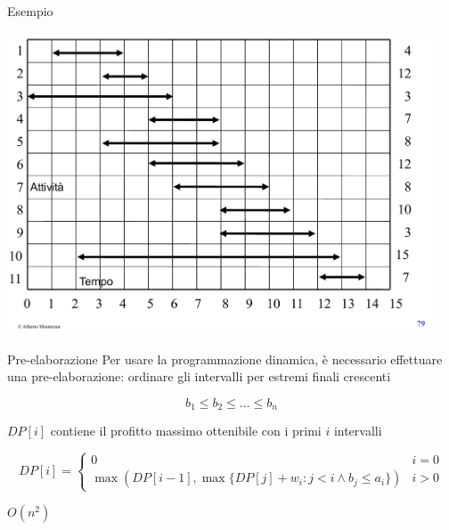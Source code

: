 \begin{frame}{Esempio}

\vspace{-12pt}
\begin{center}
\includegraphics[width=0.95\textwidth,page=2]{intervalli-esempio.pdf}
\end{center}

\end{frame}

\begin{frame}{Pre-elaborazione}
Per usare la programmazione dinamica, è necessario effettuare una pre-elaborazione: ordinare gli intervalli per estremi finali crescenti

  \[
     b_1 \leq b_2 \leq \ldots \leq b_n
  \]

\smallskip
{}
$DP[i]$ contiene il profitto massimo ottenibile con i primi $i$ intervalli

\[
  DP[i] = \begin{cases}
    0 & i = 0 \\
    \max (DP[i-1], \max \{ DP[j]+w_i : j < i \wedge b_j \leq a_i \} ) & i > 0
  \end{cases}
\]

\pause 

\smallskip
$O(n^2)$

\end{frame}

